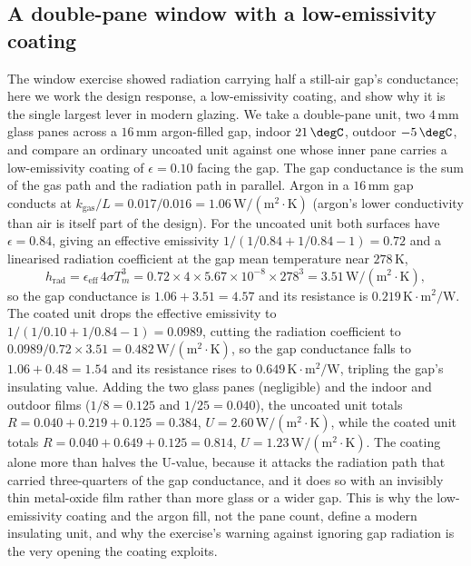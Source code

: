 \subsection{A double-pane window with a low-emissivity coating}

The window exercise showed radiation carrying half a still-air gap's
conductance; here we work the design response, a low-emissivity coating, and
show why it is the single largest lever in modern glazing. We take a
double-pane unit, two $4\,\si{\milli\meter}$ glass panes across a
$16\,\si{\milli\meter}$ argon-filled gap, indoor $21\,\degC$, outdoor
$-5\,\degC$, and compare an ordinary uncoated unit against one whose inner
pane carries a low-emissivity coating of $\epsilon = 0.10$ facing the gap.
The gap conductance is the sum of the gas path and the radiation path in
parallel. Argon in a $16\,\si{\milli\meter}$ gap conducts at
$k_{\text{gas}}/L = 0.017/0.016 = 1.06\,\text{W}/(\text{m}^2\cdot\si{
\kelvin})$ (argon's lower conductivity than air is itself part of the
design). For the uncoated unit both surfaces have $\epsilon = 0.84$, giving
an effective emissivity $1/(1/0.84 + 1/0.84 - 1) = 0.72$ and a linearised
radiation coefficient at the gap mean temperature near $278\,\si{\kelvin}$,
\[
h_{\text{rad}} = \epsilon_{\text{eff}}\,4\sigma T_m^3 = 0.72\times4\times
5.67\times10^{-8}\times278^3 = 3.51\,\text{W}/(\text{m}^2\cdot\si{\kelvin}),
\]
so the gap conductance is $1.06 + 3.51 = 4.57$ and its resistance is
$0.219\,\si{\kelvin}\cdot\text{m}^2/\text{W}$. The coated unit drops the
effective emissivity to $1/(1/0.10 + 1/0.84 - 1) = 0.0989$, cutting the
radiation coefficient to $0.0989/0.72\times3.51 = 0.482\,\text{W}/(\text{m}
^2\cdot\si{\kelvin})$, so the gap conductance falls to $1.06 + 0.48 = 1.54$
and its resistance rises to $0.649\,\si{\kelvin}\cdot\text{m}^2/\text{W}$,
tripling the gap's insulating value. Adding the two glass panes (negligible)
and the indoor and outdoor films ($1/8 = 0.125$ and $1/25 = 0.040$), the
uncoated unit totals $R = 0.040 + 0.219 + 0.125 = 0.384$, $U = 2.60\,
\text{W}/(\text{m}^2\cdot\si{\kelvin})$, while the coated unit totals $R =
0.040 + 0.649 + 0.125 = 0.814$, $U = 1.23\,\text{W}/(\text{m}^2\cdot\si{
\kelvin})$. The coating alone more than halves the U-value, because it
attacks the radiation path that carried three-quarters of the gap
conductance, and it does so with an invisibly thin metal-oxide film rather
than more glass or a wider gap. This is why the low-emissivity coating and
the argon fill, not the pane count, define a modern insulating unit, and
why the exercise's warning against ignoring gap radiation is the very
opening the coating exploits.

